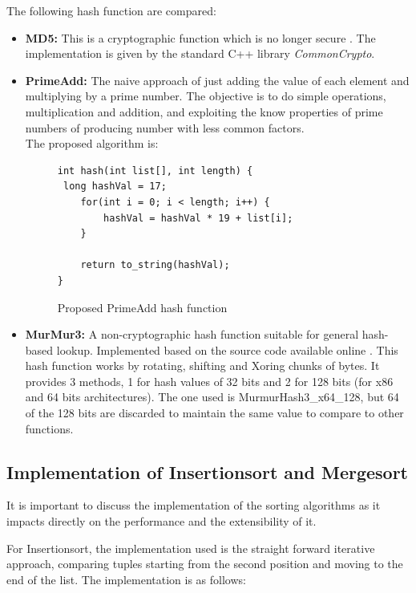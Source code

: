 \documentclass[a4paper,12pt]{article}
\begin{document}
The following hash function are compared:

\begin{itemize}

\item {\bf MD5:} This is a cryptographic function \cite{rivest1992md5} which is no longer secure \cite{wang2005break}.  The implementation is given by the standard C++ library {\it CommonCrypto}.

\item {\bf PrimeAdd:} The naive approach of just adding the value of each element and multiplying by a prime number. The objective is to do simple operations, multiplication and addition, and exploiting the know properties of prime numbers of producing number with less common factors. \\ 
The proposed algorithm is:

\begin{figure}[H]
\begin{verbatim}
int hash(int list[], int length) {
 long hashVal = 17;
    for(int i = 0; i < length; i++) {
        hashVal = hashVal * 19 + list[i];
    }

    return to_string(hashVal);
}
\end{verbatim}
\caption{Proposed PrimeAdd hash function}
\end{figure}
 

\item {\bf MurMur3:} A non-cryptographic hash function suitable for general hash-based lookup. Implemented based on the source code available online \cite{MurMur3}. This hash function works by rotating, shifting and Xoring chunks of bytes. It provides 3 methods, 1 for hash values of 32 bits and 2 for 128 bits (for x86 and 64 bits architectures). The one used is MurmurHash3\_x64\_128, but 64 of the 128 bits are discarded to maintain the same value to compare to other functions.

\end{itemize}

\subsection{Implementation of Insertionsort and Mergesort}
It is important to discuss the implementation of the sorting algorithms as it impacts directly on the performance and the extensibility of it.

For Insertionsort, the implementation used is the straight forward iterative approach, comparing tuples starting from the second position and moving to the end of the list. The implementation is as follows:
\end{document}
